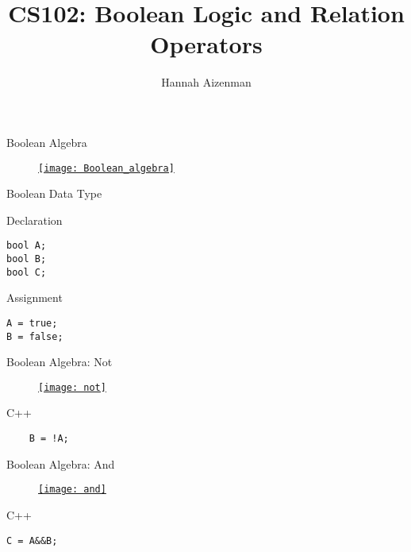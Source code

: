 \documentclass[xcolor={dvipsnames}]{beamer}
\begin{document}
\title{ CS102: Boolean Logic and Relation Operators }
\author{Hannah Aizenman}


\begin{frame}
	\titlepage
\end{frame}


\begin{frame}{Boolean Algebra}
	\begin{figure}
		\href{http://www.daviddarling.info/encyclopedia/B/Boolean_algebra.html}{\texttt{[image: Boolean\_algebra]}}
	\end{figure}
\end{frame}



\begin{frame}[fragile]{Boolean Data Type}
\LARGE
\begin{block}{Declaration}
	\begin{center}
\begin{verbatim}
bool A;
bool B;
bool C;
\end{verbatim}
	\end{center}
\end{block}
\pause
\begin{block}{Assignment}
\begin{verbatim}
A = true;
B = false;
\end{verbatim}
\end{block}
\end{frame}

\begin{frame}[fragile]{Boolean Algebra: Not}
	\begin{figure}
		\href{http://www.daviddarling.info/encyclopedia/B/Boolean_algebra.html}{\texttt{[image: not]}}
	\end{figure}
	\pause
	\begin{block}{C++}
\Huge
	\begin{verbatim}
	B = !A;
	\end{verbatim}
	\end{block}
\end{frame}

\begin{frame}[fragile]{Boolean Algebra: And}
	\begin{figure}
		\href{http://www.daviddarling.info/encyclopedia/B/Boolean_algebra.html}{\texttt{[image: and]}}
	\end{figure}
	\pause

	\begin{block}{C++}
\Huge
\begin{verbatim}
C = A&&B;
\end{verbatim}
	\end{block}
\end{frame}
\end{document}
